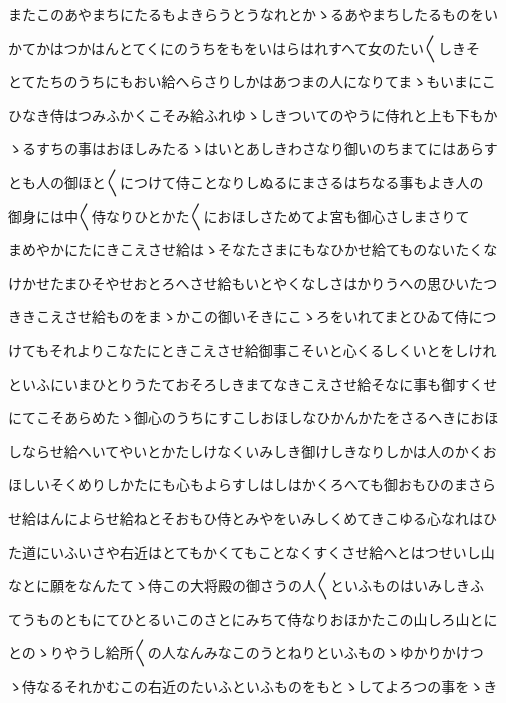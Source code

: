 \documentclass[a4paper,11pt,landscape]{ltjtarticle}
\begin{document}
\par\medskip
またこのあやまちにたるもよきらうとうなれとかゝるあやまちしたるものをい
\par\medskip
かてかはつかはんとてくにのうちをもをいはらはれすへて女のたい〱しきそ
\par\medskip
とてたちのうちにもおい給へらさりしかはあつまの人になりてまゝもいまにこ
\par\medskip
ひなき侍はつみふかくこそみ給ふれゆゝしきついてのやうに侍れと上も下もか
\par\medskip
ゝるすちの事はおほしみたるゝはいとあしきわさなり御いのちまてにはあらす
\par\medskip
とも人の御ほと〱につけて侍ことなりしぬるにまさるはちなる事もよき人の
\par\medskip
御身には中〱侍なりひとかた〱におほしさためてよ宮も御心さしまさりて
\par\medskip
まめやかにたにきこえさせ給はゝそなたさまにもなひかせ給てものないたくな
\par\medskip
けかせたまひそやせおとろへさせ給もいとやくなしさはかりうへの思ひいたつ
\par\medskip
ききこえさせ給ものをまゝかこの御いそきにこゝろをいれてまとひゐて侍につ
\par\medskip
けてもそれよりこなたにときこえさせ給御事こそいと心くるしくいとをしけれ
\par\medskip
といふにいまひとりうたておそろしきまてなきこえさせ給そなに事も御すくせ
\par\medskip
にてこそあらめたゝ御心のうちにすこしおほしなひかんかたをさるへきにおほ
\par\medskip
しならせ給へいてやいとかたしけなくいみしき御けしきなりしかは人のかくお
\par\medskip
ほしいそくめりしかたにも心もよらすしはしはかくろへても御おもひのまさら
\par\medskip
せ給はんによらせ給ねとそおもひ侍とみやをいみしくめてきこゆる心なれはひ
\par\medskip
た道にいふいさや右近はとてもかくてもことなくすくさせ給へとはつせいし山
\par\medskip
なとに願をなんたてゝ侍この大将殿の御さうの人〱といふものはいみしきふ
\par\medskip
てうものともにてひとるいこのさとにみちて侍なりおほかたこの山しろ山とに
\par\medskip
とのゝりやうし給所〱の人なんみなこのうとねりといふものゝゆかりかけつ
\par\medskip
ゝ侍なるそれかむこの右近のたいふといふものをもとゝしてよろつの事をゝき
\par\medskip
\end{document}
